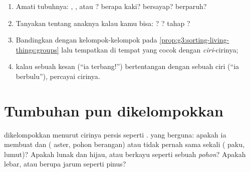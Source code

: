 \begin{method}\label{met:g3:sorting-living-things:sort}
\begin{enumerate}
  \item Amati tubuhnya: , ,  atau ? berapa
        kaki? bersayap? berparuh?
  \item Tanyakan tentang anaknya kalau kamu bisa: ? ? tahap
        ?
  \item Bandingkan dengan kelompok-kelompok pada
        \cref{prop:g3:sorting-living-things:groups} lalu tempatkan
         di tempat yang cocok dengan \emph{ciri}-cirinya;
  \item kalau sebuah kesan (``ia terbang!'') bertentangan dengan
        sebuah ciri (``ia berbulu''), percayai cirinya.
\end{enumerate}
\end{method}

\section{Tumbuhan pun dikelompokkan}

\begin{proposition}\label{prop:g3:sorting-living-things:plants}
 dikelompokkan menurut cirinya persis seperti . 
yang berguna: apakah ia membuat \emph{} dan  ( aster,
pohon berangan) atau tidak pernah sama sekali ( paku, lumut)?
Apakah  lunak dan hijau, atau berkayu seperti 
sebuah \emph{pohon}? Apakah  lebar, atau berupa jarum seperti
 pinus?
\end{proposition}
\admitted


